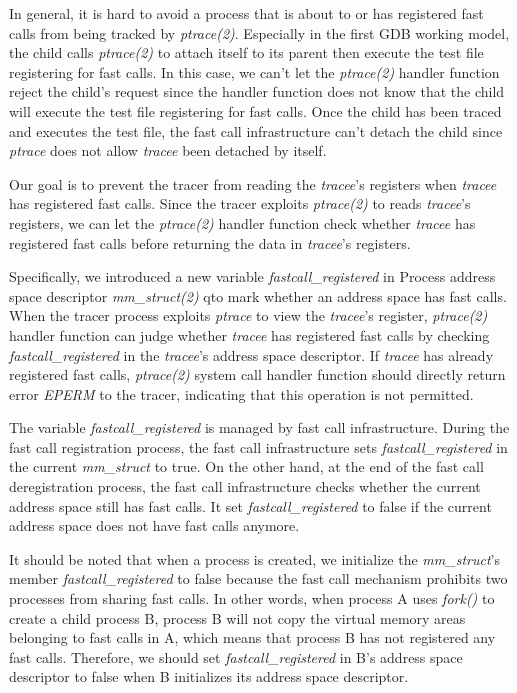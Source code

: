 In general, it is hard to avoid a process that is about to or has 
registered fast calls from being tracked by \emph{ptrace(2)}. Especially in the 
first GDB  working model, the child calls \emph{ptrace(2)} to attach itself 
to its parent then execute the test file registering for fast calls. 
In this case, we can't let the \emph{ptrace(2)} handler function reject the 
child's request since the handler function does not know that 
the child will execute the test file registering for fast calls. 
Once the child has been traced and executes the test file, the fast 
call infrastructure can't detach the child since \emph{ptrace} does not allow 
\emph{tracee} been detached by itself.

Our goal is to prevent the tracer from reading the 
\emph{tracee}'s registers when \emph{tracee} has registered fast calls. 
Since the tracer exploits \emph{ptrace(2)} to reads \emph{tracee}'s registers, 
we can let the \emph{ptrace(2)} handler function check whether \emph{tracee} has 
registered fast calls before returning the data in \emph{tracee}'s registers.


Specifically, we introduced a new variable \emph{fastcall\_registered} 
in Process address space descriptor \emph{mm\_struct(2)} qto mark whether an
address space has fast calls. When the tracer process exploits \emph{ptrace} 
to view the \emph{tracee}'s register, \emph{ptrace(2)} handler function can judge whether
\emph{tracee} has registered fast calls by checking \emph{fastcall\_registered} in 
the \emph{tracee}'s address space descriptor. If \emph{tracee} has already 
registered fast calls, \emph{ptrace(2)} system call handler function should 
directly return error \emph{EPERM} to the tracer, indicating that this 
operation is not permitted.

The variable \emph{fastcall\_registered} is managed by fast call 
infrastructure. During the fast call registration process,  
the fast call infrastructure sets \emph{fastcall\_registered} in the current 
\emph{mm\_struct} to true. On the other hand, at the end of the fast call 
deregistration process, the fast call infrastructure checks whether 
the current address space still has fast calls. It set \emph{fastcall\_registered}  
to false if the current address space does not have fast calls anymore.


It should be noted that when a process is created, we initialize 
the \emph{mm\_struct}'s member \emph{fastcall\_registered}  to false because 
the fast call mechanism prohibits two processes from sharing fast calls.
 In other words, when process A uses \emph{fork()} to create a child process B, 
 process B will not copy the virtual memory areas belonging to fast calls in A, 
 which means that process B has not registered any fast calls. 
 Therefore, we should set \emph{fastcall\_registered}  in B's address space 
 descriptor to false when B initializes its address space descriptor.

